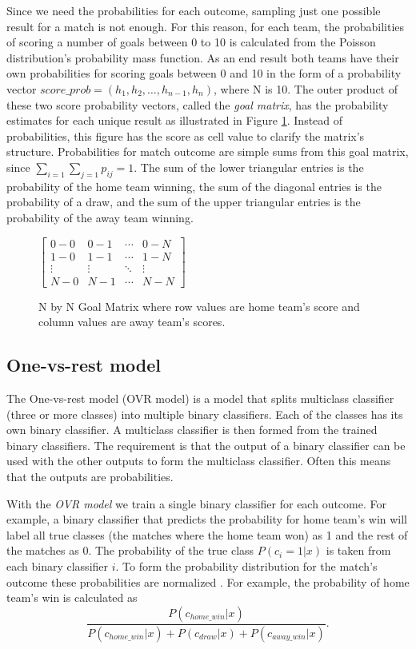 Since we need the probabilities for each outcome, sampling just one possible result for a match is not enough. For this reason, for each team, the probabilities of scoring a number of goals between 0 to 10 is calculated from the Poisson distribution's probability mass function. As an end result both teams have their own probabilities for scoring goals between 0 and 10 in the form of a probability vector $score\_prob = \left( h _ { 1 } , h _ { 2 } , \dots , h _ { n - 1 } , h _ { n } \right)$, where N is 10. The outer product of these two score probability vectors, called the \textit{goal matrix}, has the probability estimates for each unique result as illustrated in Figure \ref{fig:goal_matrix}. Instead of probabilities, this figure has the score as cell value to clarify the matrix's structure. Probabilities for match outcome are simple sums from this goal matrix, since $\sum_{i=1}\sum_{j=1}p_{ij} = 1$. The sum of the lower triangular entries is the probability of the home team winning, the sum of the diagonal entries is the probability of a draw, and the sum of the upper triangular entries is the probability of the away team winning.
\begin{figure}
    $\begin{bmatrix}
    0-0 & 0-1 & \cdots & 0-N \\
    1-0 & 1-1 & \cdots   &1-N \\
    \vdots & \vdots   & \ddots & \vdots \\
    N-0 & N-1 & \cdots & N-N\end{bmatrix}$
\caption{N by N Goal Matrix where row values are home team's score and column values are away team's scores.}
\label{fig:goal_matrix}
\end{figure}

\subsection{One-vs-rest model}
The One-vs-rest model (OVR model) is a model that splits multiclass classifier (three or more classes) into multiple binary classifiers. Each of the classes has its own binary classifier. A multiclass classifier is then formed from the trained binary classifiers. The requirement is that the output of a binary classifier can be used with the other outputs to form the multiclass classifier. Often this means that the outputs are probabilities.

With the \textit{OVR model} we train a single binary classifier for each outcome. For example, a binary classifier that predicts the probability for home team's win will label all true classes (the matches where the home team won) as 1 and the rest of the matches as 0. The probability of the true class $P(c_i = 1 | x)$ is taken from each binary classifier $i$. To form the probability distribution for the match's outcome these probabilities are normalized \cite{zadrozny2002transforming}. For example, the probability of home team's win is calculated as
\begin{equation}
\frac{P(c_{home\_win}| x)}{P(c_{home\_win}| x) + P(c_{draw}| x) + P(c_{away\_win}| x)} \text{.}
\end{equation}

